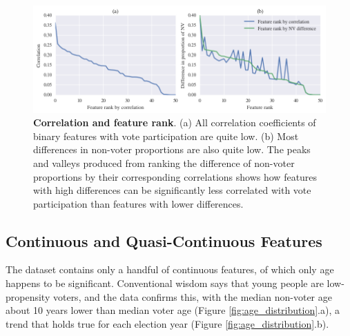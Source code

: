 \documentclass{article}
\begin{document}
	\begin{figure}[h!]
		\begin{center}
			\includegraphics*[width=0.8\linewidth]{binary_correlation}
			\caption{\textbf{Correlation and feature rank}. (a) All correlation coefficients of binary features with vote participation are quite low. (b) Most differences in non-voter proportions are also quite low. The peaks and valleys produced from ranking the difference of non-voter proportions by their corresponding correlations shows how features with high differences can be significantly less correlated with vote participation than features with lower differences.}
			\label{fig:binary_correlation}
		\end{center}
	\end{figure}
	
	\subsection{Continuous and Quasi-Continuous Features}
	
	The dataset contains only a handful of continuous features, of which only age happens to be significant. Conventional wisdom says that young people are low-propensity voters, and the data confirms this, with the median non-voter age about 10 years lower than median voter age (Figure \ref{fig:age_distribution}.a), a trend that holds true for each election year (Figure \ref{fig:age_distribution}.b).
	
\end{document}
